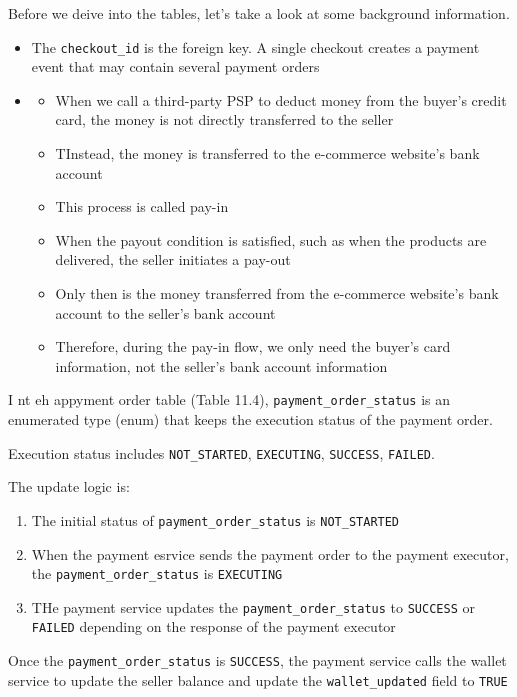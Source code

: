 \documentclass{report}
\theoremstyle{definition}
\begin{document}
Before we deive into the tables, let's take a look at some background information.

\begin{itemize}
\item
The \lstinline|checkout_id| is the foreign key. A single checkout creates a payment event that may contain several payment orders
\item

\begin{itemize}
\item
When we call a third-party PSP to deduct money from the buyer's credit card, the money is not directly transferred to the seller
\item
TInstead, the money is transferred to the e-commerce website's bank account
\item
This process is called pay-in
\item
When the payout condition is satisfied, such as when the products are delivered, the seller initiates a pay-out
\item
Only then is the money transferred from the e-commerce website's bank account to the seller's bank account
\item
Therefore, during the pay-in flow, we only need the buyer's card information, not the seller's bank account information
\end{itemize}
\end{itemize}

I nt eh appyment order table (Table 11.4), \lstinline|payment_order_status| is an enumerated type (enum) that keeps the execution status of the payment order.

Execution status includes \lstinline|NOT_STARTED|, \lstinline|EXECUTING|, \lstinline|SUCCESS|, \lstinline|FAILED|.

The update logic is:

\begin{enumerate}
\item
The initial status of \lstinline|payment_order_status| is \lstinline|NOT_STARTED|
\item
When the payment esrvice sends the payment order to the payment executor, the \lstinline|payment_order_status| is \lstinline|EXECUTING|
\item
THe payment service updates the \lstinline|payment_order_status| to \lstinline|SUCCESS| or \lstinline|FAILED| depending on the response of the payment executor
\end{enumerate}

Once the \lstinline|payment_order_status| is \lstinline|SUCCESS|, the payment service calls the wallet service to update the seller balance and update the \lstinline|wallet_updated| field to \lstinline|TRUE|
\end{document}
